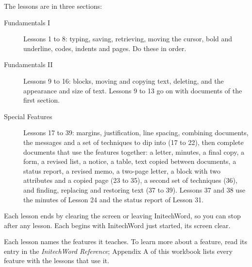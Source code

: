 The lessons are in three sections:
\begin{description}
\item[Fundamentals I] Lessons 1 to 8: typing, saving, retrieving, moving the
cursor, bold and underline, codes, indents and pages.  Do these in order.
\item[Fundamentals II] Lessons 9 to 16: blocks, moving and copying text,
deleting, and the appearance and size of text.  Lessons 9 to 13 go on with
documents of the first section.
\item[Special Features] Lessons 17 to 39: margins, justification, line
spacing, combining documents, the messages and a set of techniques to dip
into (17 to 22), then complete documents that use the features together: a
letter, minutes, a final copy, a form, a revised list, a notice, a table,
text copied between documents, a status report, a revised memo, a
two-page letter, a block with two attributes and a copied page (23 to 35),
a second set of techniques (36), and finding, replacing and restoring text
(37 to 39).  Lessons 37 and 38 use the minutes of Lesson 24 and the status
report of Lesson 31.
\end{description}
Each lesson ends by clearing the screen or leaving InitechWord, so you can
stop after any lesson.  Each begins with InitechWord just started, its
screen clear.

Each lesson names the features it teaches.  To learn more about a feature,
read its entry in the \textit{InitechWord Reference}; Appendix A of this
workbook lists every feature with the lessons that use it.
